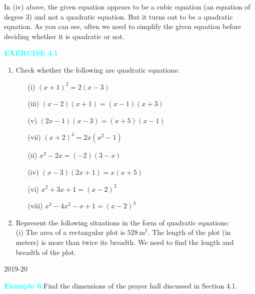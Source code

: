 \documentclass[a4paper,12pt]{article}
\begin{document}
 In (iv) above, the given equation appears to be a cubic equation (an equation of degree 3) and not a quadratic equation. But it turns out to be a quadratic equation. As you can see, often we need to simplify the given equation before deciding whether it is quadratic or not.
\vspace{0.5em}
\begin{center}
    \textcolor{cyan}{\textbf{EXERCISE 4.1}}
\end{center}
\begin{enumerate}
    \item \noindent Check whether the following are quadratic equations:
\begin{multicols}{2}
\begin{enumerate}[label=(\roman*)]
    \item[(i)] \((x+1)^2 = 2(x-3)\)
    \item[(iii)] \((x-2)(x+1) = (x-1)(x+3)\)
    \item[(v)] \((2x - 1)(x - 3) = (x + 5)(x - 1)\)
    \item[(vii)] \((x + 2)^3 = 2x(x^2 - 1)\)
\end{enumerate}
\columnbreak
\begin{enumerate}[label=(\roman*)]
    \item[(ii)] \(x^2 - 2x = (-2)(3 - x)\)
    \item[(iv)] \((x-3)(2x+1) = x(x+5)\)
    \item[(vi)] \(x^2 + 3x + 1 = (x - 2)^2\)
    \item[(viii)] \(x^3 - 4x^2 - x + 1 = (x - 2)^3\)
\end{enumerate}
\end{multicols}
\vspace{-0.9em}
\item Represent the following situations in the form of quadratic equations:\\
\noindent (i) The area of a rectangular plot is \(528 \, \text{m}^2\). The length of the plot (in meters) is more than twice its breadth. We need to find the length and breadth of the plot.
\end{enumerate}
\vspace{1.2cm}
\begin{center}
2019-20
\end{center}
\newpage
{} 
\fancyhead[R]{\textcolor{cyan}{MATHEMATICS}} 
\fancyhead[c]{}
\noindent\textcolor{cyan}{\textbf{Example 6:}}Find the dimensions of the prayer hall discussed in Section 4.1.
\end{document}
